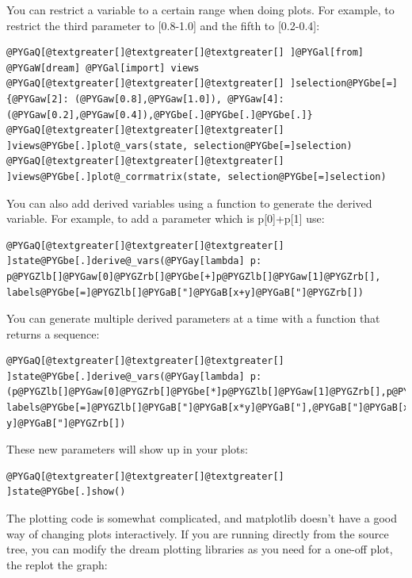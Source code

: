 \documentclass[letterpaper,10pt,english]{sphinxmanual}
\begin{document}
You can restrict a variable to a certain range when doing plots.
For example, to restrict the third parameter to {[}0.8-1.0{]} and the
fifth to {[}0.2-0.4{]}:

\begin{Verbatim}[commandchars=@\[\]]
@PYGaQ[@textgreater[]@textgreater[]@textgreater[] ]@PYGal[from] @PYGaW[dream] @PYGal[import] views
@PYGaQ[@textgreater[]@textgreater[]@textgreater[] ]selection@PYGbe[=]{@PYGaw[2]: (@PYGaw[0.8],@PYGaw[1.0]), @PYGaw[4]:(@PYGaw[0.2],@PYGaw[0.4]),@PYGbe[.]@PYGbe[.]@PYGbe[.]}
@PYGaQ[@textgreater[]@textgreater[]@textgreater[] ]views@PYGbe[.]plot@_vars(state, selection@PYGbe[=]selection)
@PYGaQ[@textgreater[]@textgreater[]@textgreater[] ]views@PYGbe[.]plot@_corrmatrix(state, selection@PYGbe[=]selection)
\end{Verbatim}

You can also add derived variables using a function to generate the
derived variable.  For example, to add a parameter which is p{[}0{]}+p{[}1{]}
use:

\begin{Verbatim}[commandchars=@\[\]]
@PYGaQ[@textgreater[]@textgreater[]@textgreater[] ]state@PYGbe[.]derive@_vars(@PYGay[lambda] p: p@PYGZlb[]@PYGaw[0]@PYGZrb[]@PYGbe[+]p@PYGZlb[]@PYGaw[1]@PYGZrb[], labels@PYGbe[=]@PYGZlb[]@PYGaB["]@PYGaB[x+y]@PYGaB["]@PYGZrb[])
\end{Verbatim}

You can generate multiple derived parameters at a time with a function
that returns a sequence:

\begin{Verbatim}[commandchars=@\[\]]
@PYGaQ[@textgreater[]@textgreater[]@textgreater[] ]state@PYGbe[.]derive@_vars(@PYGay[lambda] p: (p@PYGZlb[]@PYGaw[0]@PYGZrb[]@PYGbe[*]p@PYGZlb[]@PYGaw[1]@PYGZrb[],p@PYGZlb[]@PYGaw[0]@PYGZrb[]@PYGbe[-]p@PYGZlb[]@PYGaw[1]@PYGZrb[]), labels@PYGbe[=]@PYGZlb[]@PYGaB["]@PYGaB[x*y]@PYGaB["],@PYGaB["]@PYGaB[x-y]@PYGaB["]@PYGZrb[])
\end{Verbatim}

These new parameters will show up in your plots:

\begin{Verbatim}[commandchars=@\[\]]
@PYGaQ[@textgreater[]@textgreater[]@textgreater[] ]state@PYGbe[.]show()
\end{Verbatim}

The plotting code is somewhat complicated, and matplotlib doesn't have a
good way of changing plots interactively.  If you are running directly
from the source tree, you can modify the dream plotting libraries as you
need for a one-off plot, the replot the graph:
\end{document}
